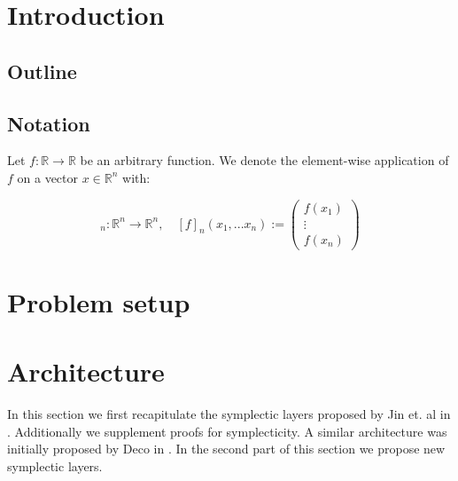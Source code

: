 \documentclass[twoside,a4paper]{article}
\begin{document}
\section{Introduction}

\subsection{Outline}

\subsection{Notation}

Let $ f: \mathbb{R} \rightarrow \mathbb{R} $ be an arbitrary function. We denote
the element-wise application of $f$ on a vector $x \in \mathbb{R}^n$ with:

\begin{equation*}
	[f]_n: \mathbb{R}^n \rightarrow \mathbb{R}^n, \quad 
	[f]_n(x_1, ... x_n) := \begin{pmatrix}
		f(x_1) \\
		\vdots \\
		f(x_n)
	\end{pmatrix}
\end{equation*}


%
%
\newpage
\section{Problem setup}

\section{Architecture}

In this section we first recapitulate the symplectic layers proposed by Jin et. al 
in \cite{Jin2020} . Additionally we supplement proofs for 
symplecticity. A similar architecture was initially proposed by Deco in \cite{Deco1995} 
. In the second part of this section 
we propose new symplectic layers.
\end{document}
